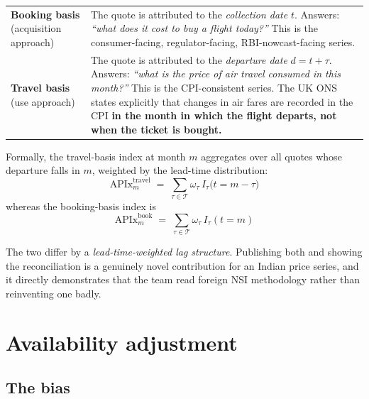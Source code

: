 \begin{center}
\small
\begin{tabularx}{\textwidth}{@{}L{3.6cm} X@{}}
\toprule
{} &  \\
\midrule
\textbf{Booking basis} \newline (acquisition approach) & The quote is attributed to the
\emph{collection date} $t$. Answers: \emph{``what does it cost to buy a flight today?''}
This is the consumer-facing, regulator-facing, RBI-nowcast-facing series. \\
\addlinespace[3pt]
\textbf{Travel basis} \newline (use approach) & The quote is attributed to the
\emph{departure date} $d = t+\tau$. Answers: \emph{``what is the price of air travel
consumed in this month?''} This is the CPI-consistent series. The UK ONS states explicitly
that changes in air fares are recorded in the CPI \textbf{in the month in which the flight
departs, not when the ticket is bought.} \\
\bottomrule
\end{tabularx}
\end{center}

Formally, the travel-basis index at month $m$ aggregates over all quotes whose departure
falls in $m$, weighted by the lead-time distribution:
\begin{equation}
\text{APIx}^{\text{travel}}_m \;=\; \sum_{\tau\in\mathcal{T}} \omega_\tau \,
I_{\tau}\big(t = m - \tau\big)
\end{equation}
whereas the booking-basis index is
\begin{equation}
\text{APIx}^{\text{book}}_m \;=\; \sum_{\tau\in\mathcal{T}} \omega_\tau \, I_{\tau}(t=m)
\end{equation}

\noindent The two differ by a \emph{lead-time-weighted lag structure}. Publishing both and
showing the reconciliation is a genuinely novel contribution for an Indian price series, and
it directly demonstrates that the team read foreign NSI methodology rather than reinventing
one badly.

\section{Availability adjustment}
\label{sec:avail}

\subsection{The bias}


